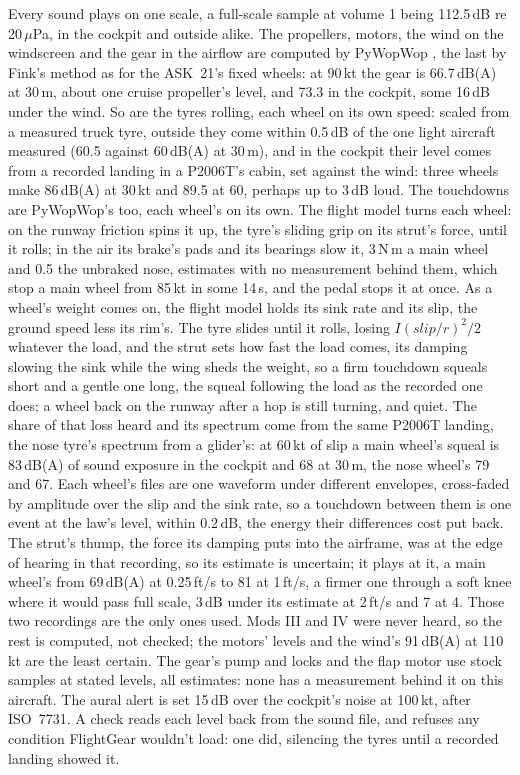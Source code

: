 \documentclass[10pt,a4paper,twocolumn]{article}
\begin{document}
Every sound plays on one scale, a full-scale sample at volume 1 being 112.5\,dB re 20\,$\mu$Pa, in the cockpit and outside alike. The propellers, motors, the wind on the windscreen and the gear in the airflow are computed by PyWopWop \cite{pww}, the last by Fink's method \cite{anopp} as for the ASK~21's fixed wheels: at 90\,kt the gear is 66.7\,dB(A) at 30\,m, about one cruise propeller's level, and 73.3 in the cockpit, some 16\,dB under the wind. So are the tyres rolling, each wheel on its own speed: scaled from a measured truck tyre, outside they come within 0.5\,dB of the one light aircraft measured (60.5 against 60\,dB(A) at 30\,m), and in the cockpit their level comes from a recorded landing in a P2006T's cabin, set against the wind: three wheels make 86\,dB(A) at 30\,kt and 89.5 at 60, perhaps up to 3\,dB loud. The touchdowns are PyWopWop's too, each wheel's on its own. The flight model turns each wheel: on the runway friction spins it up, the tyre's sliding grip on its strut's force, until it rolls; in the air its brake's pads and its bearings slow it, 3\,N\,m a main wheel and 0.5 the unbraked nose, estimates with no measurement behind them, which stop a main wheel from 85\,kt in some 14\,s, and the pedal stops it at once. As a wheel's weight comes on, the flight model holds its sink rate and its slip, the ground speed less its rim's. The tyre slides until it rolls, losing $I(\mathit{slip}/r)^2/2$ whatever the load, and the strut sets how fast the load comes, its damping slowing the sink while the wing sheds the weight, so a firm touchdown squeals short and a gentle one long, the squeal following the load as the recorded one does; a wheel back on the runway after a hop is still turning, and quiet. The share of that loss heard and its spectrum come from the same P2006T landing, the nose tyre's spectrum from a glider's: at 60\,kt of slip a main wheel's squeal is 83\,dB(A) of sound exposure in the cockpit and 68 at 30\,m, the nose wheel's 79 and 67. Each wheel's files are one waveform under different envelopes, cross-faded by amplitude over the slip and the sink rate, so a touchdown between them is one event at the law's level, within 0.2\,dB, the energy their differences cost put back. The strut's thump, the force its damping puts into the airframe, was at the edge of hearing in that recording, so its estimate is uncertain; it plays at it, a main wheel's from 69\,dB(A) at 0.25\,ft/s to 81 at 1\,ft/s, a firmer one through a soft knee where it would pass full scale, 3\,dB under its estimate at 2\,ft/s and 7 at 4. Those two recordings are the only ones used. Mods III and IV were never heard, so the rest is computed, not checked; the motors' levels and the wind's 91\,dB(A) at 110\,kt are the least certain. The gear's pump and locks and the flap motor use stock samples at stated levels, all estimates: none has a measurement behind it on this aircraft. The aural alert is set 15\,dB over the cockpit's noise at 100\,kt, after ISO~7731. A check reads each level back from the sound file, and refuses any condition FlightGear wouldn't load: one did, silencing the tyres until a recorded landing showed it.
\end{document}
